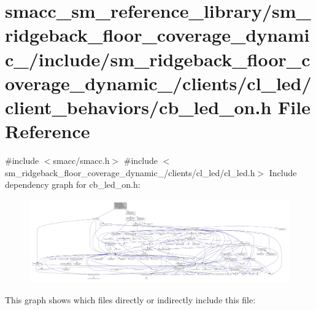 \hypertarget{sm__ridgeback__floor__coverage__dynamic__1_2include_2sm__ridgeback__floor__coverage__dynamic__1_afa9174017485d90f82f28e21c130066}{}\section{smacc\+\_\+sm\+\_\+reference\+\_\+library/sm\+\_\+ridgeback\+\_\+floor\+\_\+coverage\+\_\+dynamic\+\_/include/sm\+\_\+ridgeback\+\_\+floor\+\_\+coverage\+\_\+dynamic\+\_/clients/cl\+\_\+led/client\+\_\+behaviors/cb\+\_\+led\+\_\+on.h File Reference}
\label{sm__ridgeback__floor__coverage__dynamic__1_2include_2sm__ridgeback__floor__coverage__dynamic__1_afa9174017485d90f82f28e21c130066}
{\ttfamily \#include $<$smacc/smacc.\+h$>$}\newline
{\ttfamily \#include $<$sm\+\_\+ridgeback\+\_\+floor\+\_\+coverage\+\_\+dynamic\+\_/clients/cl\+\_\+led/cl\+\_\+led.\+h$>$}\newline
Include dependency graph for cb\+\_\+led\+\_\+on.\+h\+:
\nopagebreak
\begin{figure}[H]
\begin{center}
\leavevmode
\includegraphics[width=350pt]{sm__ridgeback__floor__coverage__dynamic__1_2include_2sm__ridgeback__floor__coverage__dynamic__1_de003c4d1aed1bc3517bb01e9b9bcc79}
\end{center}
\end{figure}
This graph shows which files directly or indirectly include this file\+:
\nopagebreak

